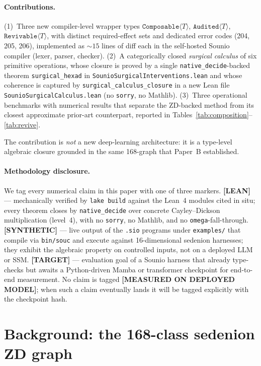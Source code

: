 \documentclass{article}
\newcommand{\Composable}[1]{\texttt{Composable}\langle #1 \rangle}
\newcommand{\Audited}[1]{\texttt{Audited}\langle #1 \rangle}
\newcommand{\Revivable}[1]{\texttt{Revivable}\langle #1 \rangle}
\begin{document}
\paragraph{Contributions.}
(1)~Three new compiler-level wrapper types $\Composable{T}$,
$\Audited{T}$, $\Revivable{T}$, with distinct required-effect sets
and dedicated error codes (204, 205, 206), implemented as $\sim15$
lines of diff each in the self-hosted Sounio compiler (lexer, parser,
checker).
(2)~A categorically closed \emph{surgical calculus} of six primitive
operations, whose closure is proved by a single
\texttt{native\_decide}-backed theorem \texttt{surgical\_hexad} in
\texttt{SounioSurgicalInterventions.lean} and whose coherence is
captured by \texttt{surgical\_calculus\_closure} in a new Lean file
\texttt{SounioSurgicalCalculus.lean} (no \texttt{sorry}, no Mathlib).
(3)~Three operational benchmarks with numerical results that separate
the ZD-backed method from its closest approximate prior-art
counterpart, reported in Tables~\ref{tab:composition}--\ref{tab:revive}.

The contribution is \emph{not} a new deep-learning architecture:
it is a type-level algebraic closure grounded in the same 168-graph
that Paper~B established.

\paragraph{Methodology disclosure.}
We tag every numerical claim in this paper with one of three markers.
\textbf{[LEAN]} --- mechanically verified by \texttt{lake build} against
the Lean~4 modules cited in situ; every theorem closes by
\texttt{native\_decide} over concrete Cayley--Dickson multiplication
(level~4), with no \texttt{sorry}, no Mathlib, and no \texttt{omega}-fall-through.
\textbf{[SYNTHETIC]} --- live output of the \texttt{.sio} programs under
\texttt{examples/} that compile via \texttt{bin/souc} and execute against
16-dimensional sedenion harnesses; they exhibit the algebraic property on
controlled inputs, not on a deployed LLM or SSM.
\textbf{[TARGET]} --- evaluation goal of a Sounio harness that already
type-checks but awaits a Python-driven Mamba or transformer checkpoint
for end-to-end measurement.
No claim is tagged \textbf{[MEASURED ON DEPLOYED MODEL]}; when such a claim
eventually lands it will be tagged explicitly with the checkpoint hash.

\section{Background: the 168-class sedenion ZD graph}
\end{document}
